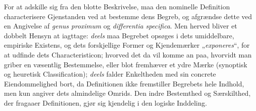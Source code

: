 \documentclass[12pt]{book}
\begin{document}
For at adskille sig fra den blotte Beskrivelse, maa den nominelle Definition
characterisere Gjenstanden ved at bestemme dens Begreb, og afgrændse dette ved en
Angivelse af \textit{genus proximum} og \textit{differentia specifica}. Men herved
bliver et dobbelt Hensyn at iagttage: \emph{deels} maa Begrebet opsøges i dets
umiddelbare, empiriske Existens, og dets forskjellige Former og Kjendemærker
„\emph{exponeres}“, for at udfinde dets Characteristicon; hvorved det da vil komme
an paa, hvorvidt man griber en væsentlig Bestemmelse, eller blot fremhæver et ydre
Mærke (synoptisk og heuretisk Classification); \emph{deels} falder Enkeltheden med
sin concrete Eiendommelighed bort, da Definitionen ikke fremstiller Begrebets hele
Indhold, men kun angiver dets almindelige Omrids. Den indre Bestemthed og
Særskilthed, der fragaaer Definitionen, gjør sig kjendelig i den logiske
Inddeling.
\end{document}
